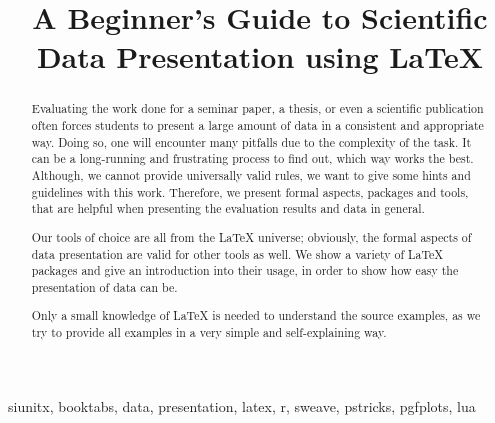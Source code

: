 \documentclass[conference,a4paper,english]{IEEEtran}
\begin{document}
\title{A Beginner's Guide to Scientific Data Presentation using \LaTeX}

\author{
  }

\maketitle

\begin{abstract}
  Evaluating the work done for a seminar paper, a thesis, or even a scientific
  publication often forces students to present a large amount of data in a
  consistent and appropriate way.  Doing so, one will encounter many pitfalls
  due to the complexity of the task.  It can be a long-running and frustrating
  process to find out, which way works the best.  Although, we cannot provide
  universally valid rules, we want to give some hints and guidelines with this
  work.  Therefore, we present formal aspects, packages and tools, that are
  helpful when presenting the evaluation results and data in general.

  Our tools of choice are all from the \LaTeX{} universe; obviously, the formal
  aspects of data presentation are valid for other tools as well.  We show a
  variety of \LaTeX{} packages and give an introduction into their usage, in
  order to show how easy the presentation of data can be.

  Only a small knowledge of \LaTeX{} is needed to understand the source
  examples, as we try to provide all examples in a very simple and
  self-explaining way.
\end{abstract}
\begin{IEEEkeywords}
  siunitx, booktabs, data, presentation, latex, r, sweave, pstricks, pgfplots,
  lua
\end{IEEEkeywords}












\end{document}
